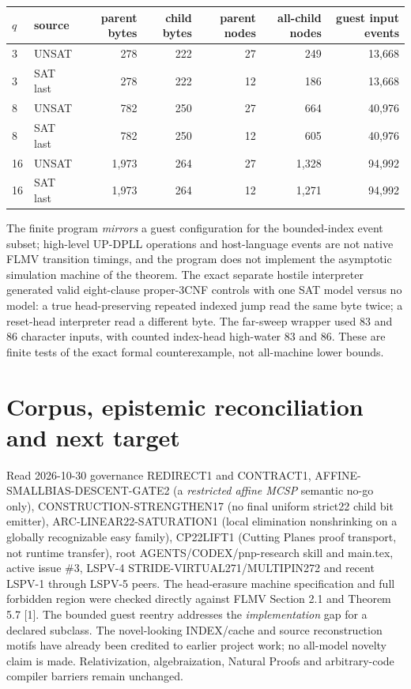 \documentclass[11pt]{article}
\begin{document}
\begin{center}\small
\begin{tabular}{llrrrrr}\toprule
$q$&source&parent bytes&child bytes&parent nodes&all-child nodes&guest input events\\\midrule
3&UNSAT&278&222&27&249&13,668\\
3&SAT last&278&222&12&186&13,668\\
8&UNSAT&782&250&27&664&40,976\\
8&SAT last&782&250&12&605&40,976\\
16&UNSAT&1,973&264&27&1,328&94,992\\
16&SAT last&1,973&264&12&1,271&94,992\\\bottomrule
\end{tabular}
\end{center}
The finite program \emph{mirrors} a guest configuration for the bounded-index event subset; high-level UP-DPLL operations and host-language events are not native FLMV transition timings, and the program does not implement the asymptotic simulation machine of the theorem. The exact separate hostile interpreter generated valid eight-clause proper-3CNF controls with one SAT model versus no model: a true head-preserving repeated indexed jump read the same byte twice; a reset-head interpreter read a different byte. The far-sweep wrapper used $83$ and $86$ character inputs, with counted index-head high-water $83$ and $86$. These are finite tests of the exact formal counterexample, not all-machine lower bounds.

\section{Corpus, epistemic reconciliation and next target}
Read 2026-10-30 governance REDIRECT1 and CONTRACT1, AFFINE-SMALLBIAS-DESCENT-GATE2 (a \emph{restricted affine MCSP} semantic no-go only), CONSTRUCTION-STRENGTHEN17 (no final uniform strict22 child bit emitter), ARC-LINEAR22-SATURATION1 (local elimination nonshrinking on a globally recognizable easy family), CP22LIFT1 (Cutting Planes proof transport, not runtime transfer), root AGENTS/CODEX/pnp-research skill and main.tex, active issue \#3, LSPV-4 STRIDE-VIRTUAL271/MULTIPIN272 and recent LSPV-1 through LSPV-5 peers. The head-erasure machine specification and full forbidden region were checked directly against FLMV Section 2.1 and Theorem 5.7 [1]. The bounded guest reentry addresses the \emph{implementation} gap for a declared subclass. The novel-looking INDEX/cache and source reconstruction motifs have already been credited to earlier project work; no all-model novelty claim is made. Relativization, algebraization, Natural Proofs and arbitrary-code compiler barriers remain unchanged.
\end{document}
